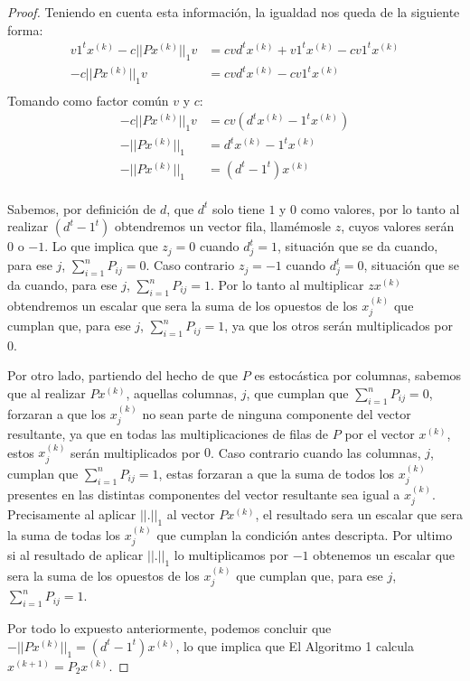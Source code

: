 \begin{proof}
\newline
Teniendo en cuenta esta información, la igualdad nos queda de la siguiente forma:
\begin{equation*}
          \begin{aligned}
            v1^{t}x^{(k)} - c||Px^{(k)}||_1v &= cvd^{t}x^{(k)} + v1^{t}x^{(k)} - cv1^{t}x^{(k)}  \\
            - c||Px^{(k)}||_1v &= cvd^{t}x^{(k)} - cv1^{t}x^{(k)}  \\
          \end{aligned}
\end{equation*}
Tomando como factor común $v$ y $c$:
\begin{equation*}
          \begin{aligned}
            - c||Px^{(k)}||_1v &= cv(d^{t}x^{(k)} - 1^{t}x^{(k)})  \\
            - ||Px^{(k)}||_1 &= d^{t}x^{(k)} - 1^{t}x^{(k)}  \\
            - ||Px^{(k)}||_1 &= (d^{t} - 1^{t})x^{(k)}  \\
          \end{aligned}
\end{equation*}

Sabemos, por definición de $d$, que $d^{t}$ solo tiene $1$ y $0$ como valores, por lo tanto al realizar $(d^{t} - 1^{t})$ obtendremos un vector fila,
llamémosle $z$, cuyos valores serán $0$ o $-1$. Lo que implica que $z_j = 0$ cuando $d^{t}_j = 1$, situación que se da cuando, para ese
$j$, $\sum_{i=1}^{n}{P_{ij}} = 0$. Caso contrario $z_j = -1$ cuando $d^{t}_j = 0$, situación que se da cuando, para ese $j$,
 $\sum_{i=1}^{n}{P_{ij}} = 1$. Por lo tanto al multiplicar $zx^{(k)}$ obtendremos un escalar que sera la suma de los opuestos de
 los $x^{(k)}_j$ que cumplan que, para ese $j$, $\sum_{i=1}^{n}{P_{ij}} = 1$, ya que los otros serán multiplicados por $0$.

Por otro lado, partiendo del hecho de que $P$ es estocástica por columnas, sabemos que al realizar $Px^{(k)}$, aquellas columnas, $j$, que
cumplan que $\sum_{i=1}^{n}{P_{ij}} = 0$, forzaran a que los $x^{(k)}_j$ no sean parte de ninguna componente del vector resultante,
ya que en todas las multiplicaciones de filas de $P$ por el vector $x^{(k)}$, estos $x^{(k)}_j$ serán multiplicados por $0$. Caso contrario
cuando las columnas, $j$, cumplan que $\sum_{i=1}^{n}{P_{ij}} = 1$, estas forzaran a que la suma de todos los $x^{(k)}_j$ presentes
en las distintas componentes del vector resultante sea igual a $x^{(k)}_j$. Precisamente al aplicar $||.||_1$ al vector $Px^{(k)}$, el
resultado sera un escalar que sera la suma de todas los $x^{(k)}_j$ que cumplan la condición antes descripta. Por ultimo si al resultado
de aplicar $||.||_1$ lo multiplicamos por $-1$ obtenemos un escalar que sera la suma de los opuestos de los $x^{(k)}_j$ que cumplan que,
para ese $j$, $\sum_{i=1}^{n}{P_{ij}} = 1$.

Por todo lo expuesto anteriormente, podemos concluir que $- ||Px^{(k)}||_1 = (d^{t} - 1^{t})x^{(k)}$, lo que implica que El Algoritmo 1
calcula $x^{(k+1)} = P_2x^{(k)}$.
\end{proof}

